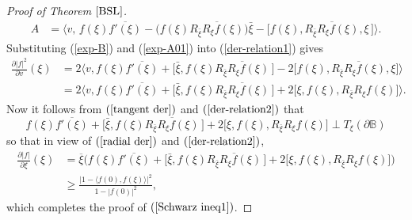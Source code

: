 \documentclass{amsart}
\theoremstyle{definition}
\theoremstyle{remark}
\numberwithin{equation}{section}
\begin{document}
\begin{proof}[Proof of Theorem $\ref{BSL}$]
\begin{equation}
\begin{split}
A&=\Big\langle v,\,f(\xi)\overline{f'(\xi)}-\Big(f(\xi)\overline{ R_{\bar{\xi}}R_{\xi}f(\xi)}\Big)\bar{\xi}-\big[f(\xi), \overline{R_{\bar{\xi}}R_{\xi}f(\xi)},\xi\,\big]\Big\rangle.
\end{split}
\end{equation}
Substituting (\ref{exp-B}) and (\ref{exp-A01}) into (\ref{der-relation1}) gives
\begin{equation}\label{der-relation2}
\begin{split}
\frac{\partial |f|^2}{\partial v}(\xi)
&=2\Big\langle v,f(\xi)\overline{f'(\xi)}+\big[\bar{\xi}, f(\xi)\overline{R_{\bar{\xi}}R_{\xi}f(\xi)}\,\big]-2\big[f(\xi), \overline{R_{\bar{\xi}}R_{\xi}f(\xi)}, \xi\big]\Big\rangle\\
&=2\Big\langle v,f(\xi)\overline{f'(\xi)}+\big[\bar{\xi}, f(\xi)\overline{R_{\bar{\xi}}R_{\xi}f(\xi)}\,\big]+2\big[\xi, f(\xi), R_{\bar{\xi}}R_{\xi}f(\xi)\big]
\Big\rangle.
\end{split}
\end{equation}
Now it follows from $(\ref{tangent der})$ and $(\ref{der-relation2})$ that
$$f(\xi)\overline{f'(\xi)}+\big[\bar{\xi}, f(\xi)\overline{R_{\bar{\xi}}R_{\xi}f(\xi)}\,\big]+2\big[\xi, f(\xi), R_{\bar{\xi}}R_{\xi}f(\xi)\big]\perp
 T_{\xi}(\partial \mathbb B)$$
so that in view of $(\ref{radial der})$ and $(\ref{der-relation2})$,
\begin{equation*}
\begin{split}
\frac{\partial |f|}{\partial \xi}(\xi)
&=\overline{\xi}\Big(f(\xi)\overline{f'(\xi)}+\big[\bar{\xi}, f(\xi)\overline{R_{\bar{\xi}}R_{\xi}f(\xi)}\,\big]+2\big[\xi, f(\xi), R_{\bar{\xi}}R_{\xi}f(\xi)\big]\Big)
\\
&\geq \frac{\big|1-\big\langle f(0), f(\xi)\big\rangle\big|^2}{1-|f(0)|^2},
\end{split}
\end{equation*}
which completes the proof of $(\ref{Schwarz ineq1})$.


\end{proof}
\end{document}
